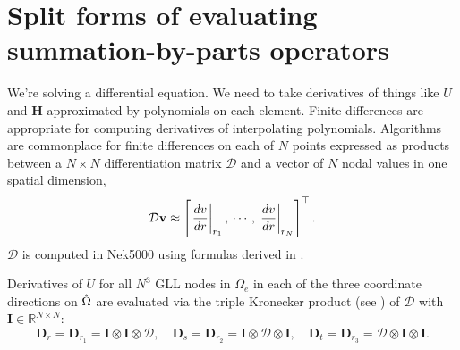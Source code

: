 \section{Split forms of evaluating summation-by-parts operators\label{splitform}}
We're solving a differential equation. We need to take derivatives of things
like $U$ and $\mathbf{H}$ approximated by polynomials on each element.
Finite differences are appropriate for computing derivatives of interpolating polynomials.
Algorithms are commonplace for finite differences on each of $N$ points expressed as
products between a $N\times N$ differentiation matrix $\mathcal{D}$ and a
vector of $N$ nodal values in one spatial dimension,
\begin{equation}
\mathcal{D}{\bf v} \approx\left[\left.\frac{d v}{d r}\right|_{r_1},\, \cdots,\,\left.\frac{d v}{d r}\right|_{r_N} \right]^{\top}.
\label{diffmat1D}
\end{equation}
$\mathcal{D}$ is computed in Nek5000 using formulas derived in \cite[\S]{dfm02}.

Derivatives of $U$ for all $N^3$ GLL nodes in $\Omega_e$ in each of the three coordinate directions on
${\hat \Omega}$ are evaluated via the triple Kronecker product (see \cite[\S]{dfm02}) of $\mathcal{D}$ with
$\mathbf{I} \in\mathbb{R}^{N\times N}$:
\begin{equation}
\mathbf{D}_r=\mathbf{D}_{r_1}=\mathbf{I}  \otimes \mathbf{I} \otimes \mathcal{D}, \quad
\mathbf{D}_s=\mathbf{D}_{r_2}=\mathbf{I}  \otimes \mathcal{D}\otimes \mathbf{I} , \quad
\mathbf{D}_t=\mathbf{D}_{r_3}=\mathcal{D} \otimes \mathbf{I} \otimes \mathbf{I}.
\label{diffkron}
\end{equation}

